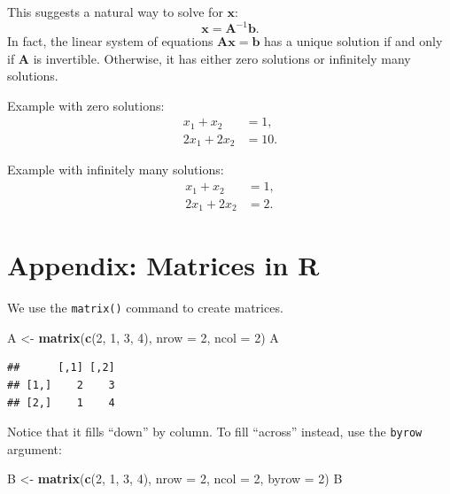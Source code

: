 \documentclass[
  12pt,
  oneside,openany]{book}
\newenvironment{Shaded}{\begin{snugshade}}{\end{snugshade}}
\newcommand{\DataTypeTok}[1]{\textcolor[rgb]{0.13,0.29,0.53}{#1}}
\newcommand{\DecValTok}[1]{\textcolor[rgb]{0.00,0.00,0.81}{#1}}
\newcommand{\KeywordTok}[1]{\textcolor[rgb]{0.13,0.29,0.53}{\textbf{#1}}}
\newcommand{\NormalTok}[1]{#1}
\newcommand{\StringTok}[1]{\textcolor[rgb]{0.31,0.60,0.02}{#1}}
\begin{document}
This suggests a natural way to solve for \(\mathbf{x}\): \[\mathbf{x} = \mathbf{A}^{-1} \mathbf{b}.\] In fact, the linear system of equations \(\mathbf{A} \mathbf{x} = \mathbf{b}\) has a unique solution if and only if \(\mathbf{A}\) is invertible. Otherwise, it has either zero solutions or infinitely many solutions.

Example with zero solutions:
\[
\begin{aligned}
x_1 + x_2 &= 1, \\
2 x_1 + 2 x_2 &= 10.
\end{aligned}
\]

Example with infinitely many solutions:
\[
\begin{aligned}
x_1 + x_2 &= 1, \\
2 x_1 + 2 x_2 &= 2.
\end{aligned}
\]

\hypertarget{appendix-matrices-in-r}{%
\section{Appendix: Matrices in R}\label{appendix-matrices-in-r}}

We use the \texttt{matrix()} command to create matrices.

\begin{Shaded}
\begin{Highlighting}[]
\NormalTok{A \textless{}{-}}\StringTok{ }\KeywordTok{matrix}\NormalTok{(}\KeywordTok{c}\NormalTok{(}\DecValTok{2}\NormalTok{, }\DecValTok{1}\NormalTok{, }\DecValTok{3}\NormalTok{, }\DecValTok{4}\NormalTok{),}
            \DataTypeTok{nrow =} \DecValTok{2}\NormalTok{,}
            \DataTypeTok{ncol =} \DecValTok{2}\NormalTok{)}
\NormalTok{A}
\end{Highlighting}
\end{Shaded}

\begin{verbatim}
##      [,1] [,2]
## [1,]    2    3
## [2,]    1    4
\end{verbatim}

Notice that it fills ``down'' by column. To fill ``across'' instead, use the \texttt{byrow} argument:

\begin{Shaded}
\begin{Highlighting}[]
\NormalTok{B \textless{}{-}}\StringTok{ }\KeywordTok{matrix}\NormalTok{(}\KeywordTok{c}\NormalTok{(}\DecValTok{2}\NormalTok{, }\DecValTok{1}\NormalTok{, }\DecValTok{3}\NormalTok{, }\DecValTok{4}\NormalTok{),}
            \DataTypeTok{nrow =} \DecValTok{2}\NormalTok{,}
            \DataTypeTok{ncol =} \DecValTok{2}\NormalTok{,}
            \DataTypeTok{byrow =} \DecValTok{2}\NormalTok{)}
\NormalTok{B}
\end{Highlighting}
\end{Shaded}
\end{document}
